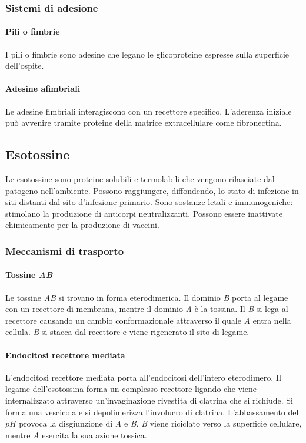 		\subsubsection{Sistemi di adesione}

			\paragraph{Pili o fimbrie}
			I pili o fimbrie sono adesine che legano le glicoproteine espresse sulla superficie dell'ospite.

			\paragraph{Adesine afimbriali}
			Le adesine fimbriali interagiscono con un recettore specifico.
			L'aderenza iniziale pu\`o avvenire tramite proteine della matrice extracellulare come fibronectina.


	\subsection{Esotossine}
	Le esotossine sono proteine solubili e termolabili che vengono rilasciate dal patogeno nell'ambiente.
	Possono raggiungere, diffondendo, lo stato di infezione in siti distanti dal sito d'infezione primario.
	Sono sostanze letali e immunogeniche: stimolano la produzione di anticorpi neutralizzanti.
	Possono essere inattivate chimicamente per la produzione di vaccini.

		\subsubsection{Meccanismi di trasporto}

			\paragraph{Tossine \emph{AB}}
			Le tossine \emph{AB} si trovano in forma eterodimerica.
			Il dominio \emph{B} porta al legame con un recettore di membrana, mentre il dominio \emph{A} \`e la tossina.
			Il \emph{B} si lega al recettore causando un cambio conformazionale attraverso il quale \emph{A} entra nella cellula.
			\emph{B} si stacca dal recettore e viene rigenerato il sito di legame.

			\paragraph{Endocitosi recettore mediata}
			L'endocitosi recettore mediata porta all'endocitosi dell'intero eterodimero.
			Il legame dell'esotossina forma un complesso recettore-ligando che viene internalizzato attraverso un'invaginazione rivestita di clatrina che si richiude.
			Si forma una vescicola e si depolimerizza l'involucro di clatrina.
			L'abbassamento del $pH$ provoca la disgiunzione di \emph{A} e \emph{B}.
			\emph{B} viene riciclato verso la superficie cellulare, mentre \emph{A} esercita la sua azione tossica.


